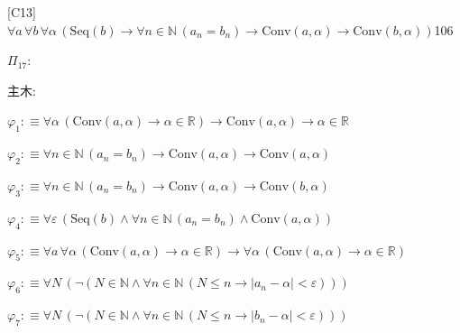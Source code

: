 \begin{fullproof}{[C13]}{$\forall a\,\forall b\,\forall \alpha\,(\mathrm{Seq}(b) \to \forall n \in \mathbb{N}\,(a_{n} = b_{n}) \to \mathrm{Conv}(a,\alpha) \to \mathrm{Conv}(b,\alpha))$}{106}
\begin{ptree}
\end{ptree}
\noindent$\Pi_{17}$:
\begin{ptree}
\noLine
{}
\end{ptree}
\noindent 主木:
\begin{ptree}
\noLine
{}
\noLine
{}
\noLine
{}
\end{ptree}
\begin{abbrevlist}
\item $\varphi_{1} :\equiv \forall \alpha\,(\mathrm{Conv}(a,\alpha) \to \alpha \in \mathbb{R}) \to \mathrm{Conv}(a,\alpha) \to \alpha \in \mathbb{R}$
\item $\varphi_{2} :\equiv \forall n \in \mathbb{N}\,(a_{n} = b_{n}) \to \mathrm{Conv}(a,\alpha) \to \mathrm{Conv}(a,\alpha)$
\item $\varphi_{3} :\equiv \forall n \in \mathbb{N}\,(a_{n} = b_{n}) \to \mathrm{Conv}(a,\alpha) \to \mathrm{Conv}(b,\alpha)$
\item $\varphi_{4} :\equiv \forall \varepsilon\,(\mathrm{Seq}(b) \land \forall n \in \mathbb{N}\,(a_{n} = b_{n}) \land \mathrm{Conv}(a,\alpha))$
\item $\varphi_{5} :\equiv \forall a\,\forall \alpha\,(\mathrm{Conv}(a,\alpha) \to \alpha \in \mathbb{R}) \to \forall \alpha\,(\mathrm{Conv}(a,\alpha) \to \alpha \in \mathbb{R})$
\item $\varphi_{6} :\equiv \forall N\,(\neg (N \in \mathbb{N} \land \forall n \in \mathbb{N}\,(N \leq n \to \lvert a_{n} - \alpha \rvert < \varepsilon)))$
\item $\varphi_{7} :\equiv \forall N\,(\neg (N \in \mathbb{N} \land \forall n \in \mathbb{N}\,(N \leq n \to \lvert b_{n} - \alpha \rvert < \varepsilon)))$

\end{abbrevlist}
\end{fullproof}
